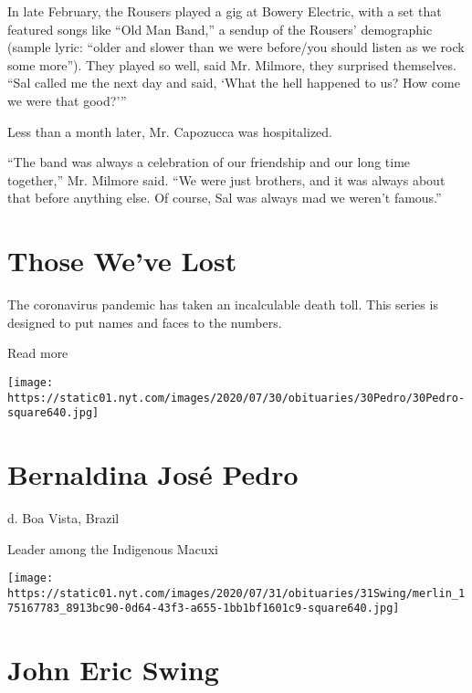 In late February, the Rousers played a gig at Bowery Electric, with a
set that featured songs like ``Old Man Band,'' a sendup of the Rousers'
demographic (sample lyric: ``older and slower than we were before/you
should listen as we rock some more''). They played so well, said Mr.
Milmore, they surprised themselves. ``Sal called me the next day and
said, `What the hell happened to us? How come we were that good?'''

Less than a month later, Mr. Capozucca was hospitalized.

``The band was always a celebration of our friendship and our long time
together,'' Mr. Milmore said. ``We were just brothers, and it was always
about that before anything else. Of course, Sal was always mad we
weren't famous.''

\href{https://www.nytimes.com/interactive/2020/obituaries/people-died-coronavirus-obituaries.html?action=click\&pgtype=Article\&state=default\&region=BELOW_MAIN_CONTENT\&context=covid_obits_promo}{}

\hypertarget{those-weve-lost}{%
\section{Those We've Lost}\label{those-weve-lost}}

The coronavirus pandemic has taken an incalculable death toll. This
series is designed to put names and faces to the numbers.

Read more

\texttt{[image: https://static01.nyt.com/images/2020/07/30/obituaries/30Pedro/30Pedro-square640.jpg]}

\hypertarget{bernaldina-josuxe9-pedro}{%
\section{Bernaldina José Pedro}\label{bernaldina-josuxe9-pedro}}

d. Boa Vista, Brazil

Leader among the Indigenous Macuxi

\texttt{[image: https://static01.nyt.com/images/2020/07/31/obituaries/31Swing/merlin\_175167783\_8913bc90-0d64-43f3-a655-1bb1bf1601c9-square640.jpg]}

\hypertarget{john-eric-swing}{%
\section{John Eric Swing}\label{john-eric-swing}}

